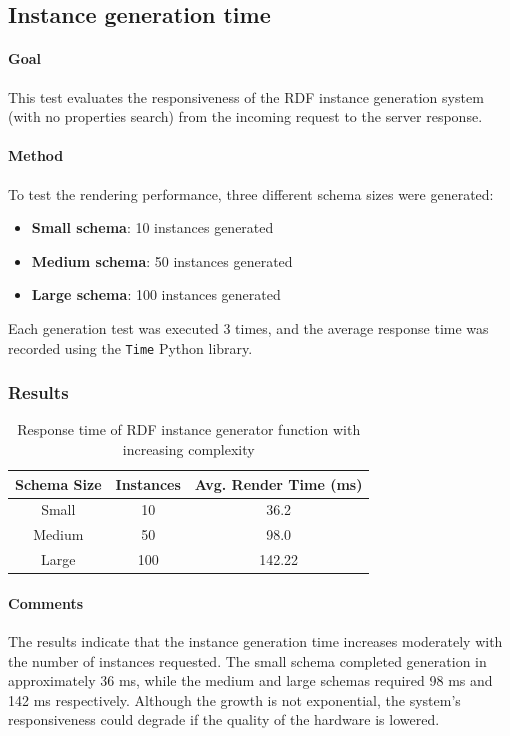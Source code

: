 \subsection{Instance generation time}

\paragraph{Goal}
This test evaluates the responsiveness of the RDF instance generation system (with no properties search) from the incoming request to the server response.

\paragraph{Method}
To test the rendering performance, three different schema sizes were generated:
\begin{itemize}
    \item \textbf{Small schema}: 10 instances generated
    \item \textbf{Medium schema}: 50 instances generated
    \item \textbf{Large schema}: 100 instances generated
\end{itemize}

Each generation test was executed 3 times, and the average response time was recorded using the \texttt{Time} Python library.

\subsubsection{Results}

\begin{table}[H]
\centering
\begin{tabular}{|c|c|c|}
\hline
\textbf{Schema Size} & \textbf{Instances} & \textbf{Avg. Render Time (ms)} \\ \hline
Small & 10 & 36.2 \\ \hline
Medium & 50 & 98.0 \\ \hline
Large & 100 & 142.22 \\ \hline
\end{tabular}
\caption{Response time of RDF instance generator function with increasing complexity}
\label{tab:rendering-times}
\end{table}

\paragraph{Comments}
The results indicate that the instance generation time increases moderately with the number of instances requested. The small schema completed generation in approximately 36 ms, while the medium and large schemas required 98 ms and 142 ms respectively. Although the growth is not exponential, the system's responsiveness could degrade if the quality of the hardware is lowered.

